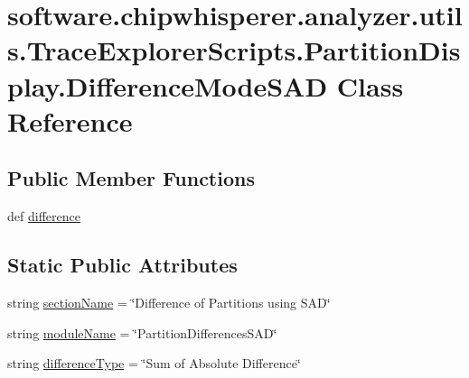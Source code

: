 \hypertarget{classsoftware_1_1chipwhisperer_1_1analyzer_1_1utils_1_1TraceExplorerScripts_1_1PartitionDisplay_1_1DifferenceModeSAD}{}\section{software.\+chipwhisperer.\+analyzer.\+utils.\+Trace\+Explorer\+Scripts.\+Partition\+Display.\+Difference\+Mode\+S\+A\+D Class Reference}
\label{classsoftware_1_1chipwhisperer_1_1analyzer_1_1utils_1_1TraceExplorerScripts_1_1PartitionDisplay_1_1DifferenceModeSAD}
\subsection*{Public Member Functions}
\begin{DoxyCompactItemize}
\item 
def \hyperlink{classsoftware_1_1chipwhisperer_1_1analyzer_1_1utils_1_1TraceExplorerScripts_1_1PartitionDisplay_1_1DifferenceModeSAD_a0590799aa1f80c95b6f3bf358add5cf7}{difference}
\end{DoxyCompactItemize}
\subsection*{Static Public Attributes}
\begin{DoxyCompactItemize}
\item 
string \hyperlink{classsoftware_1_1chipwhisperer_1_1analyzer_1_1utils_1_1TraceExplorerScripts_1_1PartitionDisplay_1_1DifferenceModeSAD_a06df339805ddf5ce09ba515252edc2de}{section\+Name} = \char`\"{}Difference of Partitions using S\+A\+D\char`\"{}
\item 
string \hyperlink{classsoftware_1_1chipwhisperer_1_1analyzer_1_1utils_1_1TraceExplorerScripts_1_1PartitionDisplay_1_1DifferenceModeSAD_a44d8cd8f4be43ca25d7d76c18a4933ea}{module\+Name} = \char`\"{}Partition\+Differences\+S\+A\+D\char`\"{}
\item 
string \hyperlink{classsoftware_1_1chipwhisperer_1_1analyzer_1_1utils_1_1TraceExplorerScripts_1_1PartitionDisplay_1_1DifferenceModeSAD_adeab64150fd0e4c9210ad903a4382200}{difference\+Type} = \char`\"{}Sum of Absolute Difference\char`\"{}
\end{DoxyCompactItemize}


